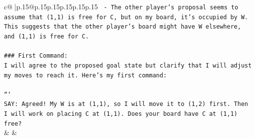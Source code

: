 \documentclass{article}
\begin{document}
{\begin{supertabular}{c@{$\;$}|p{.15\linewidth}@{}p{.15\linewidth}p{.15\linewidth}p{.15\linewidth}p{.15\linewidth}p{.15\linewidth}}
{{{\texttt{   {-} The other player's proposal seems to assume that (1,1) is free for C, but on my board, it's occupied by W. This suggests that the other player's board might have W elsewhere, and (1,1) is free for C.} \\
\\ 
\texttt{\#\#\# First Command:} \\
\texttt{I will agree to the proposed goal state but clarify that I will adjust my moves to reach it. Here's my first command:} \\
\\ 
\texttt{```} \\
\texttt{SAY: Agreed! My W is at (1,1), so I will move it to (1,2) first. Then I will work on placing C at (1,1). Does your board have C at (1,1) free?} \\
            }
        }
    }
    & & \\ \\


\end{supertabular}}
\end{document}
